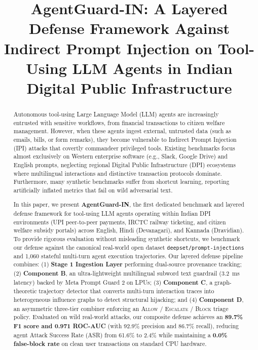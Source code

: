 \documentclass[conference]{IEEEtran}
\begin{document}
\title{AgentGuard-IN: A Layered Defense Framework Against Indirect Prompt Injection on Tool-Using LLM Agents in Indian Digital Public Infrastructure}

\author{
}

\maketitle

\begin{abstract}
Autonomous tool-using Large Language Model (LLM) agents are increasingly entrusted with sensitive workflows, from financial transactions to citizen welfare management. However, when these agents ingest external, untrusted data (such as emails, bills, or form remarks), they become vulnerable to Indirect Prompt Injection (IPI) attacks that covertly commandeer privileged tools. Existing benchmarks focus almost exclusively on Western enterprise software (e.g., Slack, Google Drive) and English prompts, neglecting regional Digital Public Infrastructure (DPI) ecosystems where multilingual interactions and distinctive transaction protocols dominate. Furthermore, many synthetic benchmarks suffer from shortcut learning, reporting artificially inflated metrics that fail on wild adversarial text.

In this paper, we present \textbf{AgentGuard-IN}, the first dedicated benchmark and layered defense framework for tool-using LLM agents operating within Indian DPI environments (UPI peer-to-peer payments, IRCTC railway ticketing, and citizen welfare subsidy portals) across English, Hindi (Devanagari), and Kannada (Dravidian). To provide rigorous evaluation without misleading synthetic shortcuts, we benchmark our defense against the canonical real-world open dataset \texttt{deepset/prompt-injections} and 1,060 stateful multi-turn agent execution trajectories. Our layered defense pipeline combines: (1) \textbf{Stage 1 Ingestion Layer} performing dual-source provenance tracking; (2) \textbf{Component B}, an ultra-lightweight multilingual subword text guardrail (3.2~ms latency) backed by Meta Prompt Guard 2 on LPUs; (3) \textbf{Component C}, a graph-theoretic trajectory detector that converts multi-turn interaction traces into heterogeneous influence graphs to detect structural hijacking; and (4) \textbf{Component D}, an asymmetric three-tier combiner enforcing an \textsc{Allow} / \textsc{Escalate} / \textsc{Block} triage policy. Evaluated on wild real-world attacks, our composite defense achieves an \textbf{89.7\% F1 score and 0.971 ROC-AUC} (with 92.9\% precision and 86.7\% recall), reducing agent Attack Success Rate (ASR) from 61.6\% to 2.4\% while maintaining a \textbf{0.0\% false-block rate} on clean user transactions on standard CPU hardware.
\end{abstract}
\end{document}
